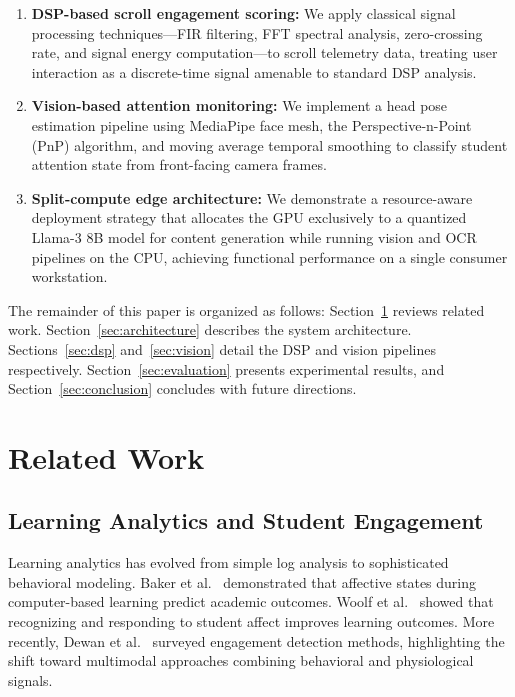 \documentclass[conference]{IEEEtran}
\begin{document}
\begin{enumerate}
    \item \textbf{DSP-based scroll engagement scoring:} We apply classical signal processing techniques---FIR filtering, FFT spectral analysis, zero-crossing rate, and signal energy computation---to scroll telemetry data, treating user interaction as a discrete-time signal amenable to standard DSP analysis.

    \item \textbf{Vision-based attention monitoring:} We implement a head pose estimation pipeline using MediaPipe face mesh, the Perspective-n-Point (PnP) algorithm, and moving average temporal smoothing to classify student attention state from front-facing camera frames.

    \item \textbf{Split-compute edge architecture:} We demonstrate a resource-aware deployment strategy that allocates the GPU exclusively to a quantized Llama-3 8B model for content generation while running vision and OCR pipelines on the CPU, achieving functional performance on a single consumer workstation.
\end{enumerate}

The remainder of this paper is organized as follows: Section~\ref{sec:related} reviews related work. Section~\ref{sec:architecture} describes the system architecture. Sections~\ref{sec:dsp} and~\ref{sec:vision} detail the DSP and vision pipelines respectively. Section~\ref{sec:evaluation} presents experimental results, and Section~\ref{sec:conclusion} concludes with future directions.

\section{Related Work}
\label{sec:related}

\subsection{Learning Analytics and Student Engagement}

Learning analytics has evolved from simple log analysis to sophisticated behavioral modeling. Baker et al.~\cite{baker2010} demonstrated that affective states during computer-based learning predict academic outcomes. Woolf et al.~\cite{woolf2009} showed that recognizing and responding to student affect improves learning outcomes. More recently, Dewan et al.~\cite{dewan2019} surveyed engagement detection methods, highlighting the shift toward multimodal approaches combining behavioral and physiological signals.
\end{document}
